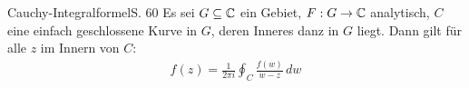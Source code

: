 \begin{satz}{Cauchy-Integralformel}{S. 60}
  \label{satz:cauchy_integralformel}
  Es sei $G \subseteq \mathbb{C}$ ein Gebiet, $F: G \to \mathbb{C}$ analytisch, $C$ eine einfach geschlossene Kurve in $G$, deren Inneres danz in $G$ liegt.
  Dann gilt für alle $z$ im Innern von $C$:
  \begin{align}
    f(z) = \frac{1}{2 \pi i} \oint_C \frac{f(w)}{w-z} \, dw
  \end{align}
\end{satz}
